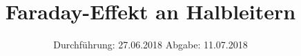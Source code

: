 

\subject{VERSUCH NUMMER 46}
\title{Faraday-Effekt an Halbleitern}
\date{
  Durchführung: 27.06.2018
  \hspace{3em}
  Abgabe: 11.07.2018
}



\thispagestyle{empty}
\maketitle
\thispagestyle{empty}
\tableofcontents
\newpage
\setcounter{page}{1}


% 




\nocite{*}
\printbibliography


